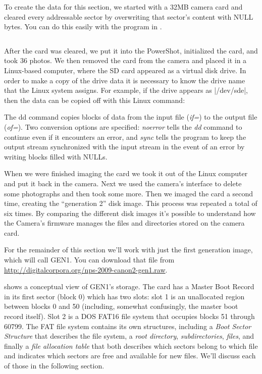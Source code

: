 To create the data for this section, we started with a 32MB camera
card and cleared every addressable sector by overwriting that sector's
content with NULL bytes. You can do this
easily with the program in .


\begin{figure}
\begin{lstlisting}
\end{lstlisting}
\caption{}\label{overwrite}
\end{figure}

After the card was cleared, we put it into the PowerShot, initialized
the card, and took 36 photos. We then removed the card from the
camera and placed it in a Linux-based computer, where the SD card
appeared as a virtual disk drive. In order to make a copy of the drive
data it is necessary to know the drive name that the Linux system
assigns. For example, if the drive appears as |/dev/sde|, then the
data can be copied off with this Linux  command:



The dd command copies blocks of data from the input file (\emph{if=})
to the output file (\emph{of=}). Two conversion options are
specified: \emph{noerror} tells the \emph{dd} command to continue even
if it encounters an error, and \emph{sync} tells the program to keep
the output stream synchronized with the input stream in the event of
an error by writing blocks filled with NULLs.  

When we were finished imaging the card we took it out of the Linux
computer and put it back in the camera. Next we used the camera's
interface to delete some photographs and then took some more. Then we
imaged the card a second time, creating the ``generation 2'' disk
image. This process was repeated a total of six times. By comparing
the different disk images it's possible to understand how the Camera's
firmware manages the files and directories stored on the camera card.

For the remainder of this section we'll work with just the first
generation image, which will call GEN1. You can download that file
from \url{http://digitalcorpora.org/nps-2009-canon2-gen1.raw}.


 shows a conceptual view of
GEN1's storage. The card has a Master Boot Record in its
first sector (block 0) which has two slots: slot 1 is an unallocated
region between blocks 0 and 50 (including, somewhat confusingly, the
master boot record itself). Slot 2 is a DOS FAT16 file system that
occupies blocks 51 through 60799. The FAT file system contains its own
structures, including a \emph{Boot Sector Structure} that describes the
file system, a \emph{root directory}, \emph{subdirectories},
\emph{files}, and finally a \emph{file allocation table} that both
describes which sectors belong to which file and indicates which
sectors are free and available for new files. We'll discuss each of
those in the following section.

